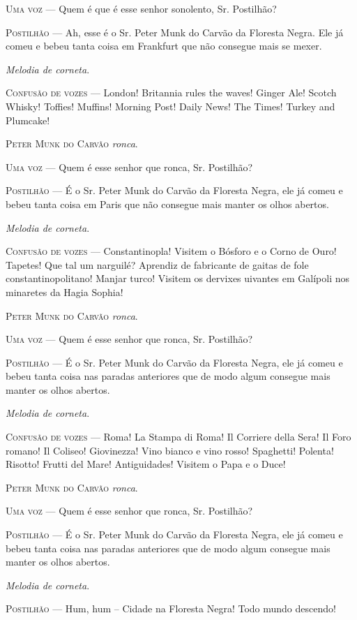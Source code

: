 \begin{myparindent}{0pt}
\begin{Parskip}
\textsc{Uma voz} --- Quem é que é esse senhor sonolento, Sr. Postilhão?

\textsc{Postilhão} --- Ah, esse é o Sr. Peter Munk do Carvão da Floresta Negra.
Ele já comeu e bebeu tanta coisa em Frankfurt que não consegue mais se
mexer.

\emph{Melodia de corneta}.

\textsc{Confusão de vozes} --- London! Britannia rules the waves! Ginger Ale!
Scotch Whisky! Toffies! Muffins! Morning Post! Daily News! The Times!
Turkey and Plumcake!

\textsc{Peter Munk do Carvão} \emph{ronca}.

\textsc{Uma voz} --- Quem é esse senhor que ronca, Sr. Postilhão?

\textsc{Postilhão} --- É o Sr. Peter Munk do Carvão da Floresta Negra, ele já
comeu e bebeu tanta coisa em Paris que não consegue mais manter os olhos
abertos.

\emph{Melodia de corneta}.

\textsc{Confusão de vozes} --- Constantinopla! Visitem o Bósforo e o Corno de
Ouro! Tapetes! Que tal um narguilé? Aprendiz de fabricante de gaitas de
fole constantinopolitano! Manjar turco! Visitem os dervixes uivantes em
Galípoli nos minaretes da Hagia Sophia!

\textsc{Peter Munk do Carvão} \emph{ronca}.

\textsc{Uma voz} --- Quem é esse senhor que ronca, Sr. Postilhão?

\textsc{Postilhão} --- É o Sr. Peter Munk do Carvão da Floresta Negra, ele já
comeu e bebeu tanta coisa nas paradas anteriores que de modo algum
consegue mais manter os olhos abertos.

\emph{Melodia de corneta}.

\textsc{Confusão de vozes} --- Roma! La Stampa di Roma! Il Corriere della Sera! Il
Foro romano! Il Coliseo! Giovinezza! Vino bianco e vino rosso!
Spaghetti! Polenta! Risotto! Frutti del Mare! Antiguidades! Visitem o
Papa e o Duce!

\textsc{Peter Munk do Carvão} \emph{ronca}.

\textsc{Uma voz} --- Quem é esse senhor que ronca, Sr. Postilhão?

\textsc{Postilhão} --- É o Sr. Peter Munk do Carvão da Floresta Negra, ele já
comeu e bebeu tanta coisa nas paradas anteriores que de modo algum
consegue mais manter os olhos abertos.

\emph{Melodia de corneta}.

\textsc{Postilhão} --- Hum, hum -- Cidade na Floresta Negra! Todo mundo descendo!


\end{Parskip}
\end{myparindent}
